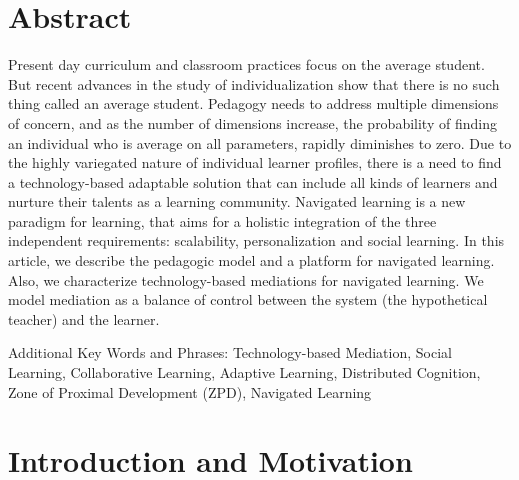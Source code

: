 \begin{multicols}{2}

\section*{Abstract} 
Present day curriculum and classroom practices focus on the average student. But recent advances in the study of individualization show that there is no such thing called an average student. Pedagogy needs to address multiple dimensions of concern, and as the number of dimensions increase, the probability of finding an individual who is average on all parameters, rapidly diminishes to zero. Due to the highly variegated nature of individual learner profiles, there is a need to find a technology-based adaptable solution that can include all kinds of learners and nurture their talents as a learning community. Navigated learning is a new paradigm for learning, that aims for a holistic integration of the three independent requirements: scalability, personalization and social learning. In this article, we describe the pedagogic model and a platform for navigated learning. Also, we characterize technology-based mediations for navigated learning. We model mediation as a balance of control between the system (the hypothetical teacher) and the learner.

 Additional Key Words and Phrases: Technology-based Mediation, Social Learning, Collaborative Learning, Adaptive Learning, Distributed Cognition, Zone of Proximal Development (ZPD), Navigated Learning 

\section{Introduction and Motivation}


\end{multicols}
